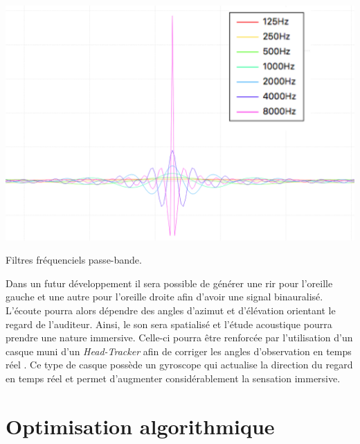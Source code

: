 \begin{figureth}
	\includegraphics[width=0.9\linewidth]{images/filtres}
	\caption{Filtres fréquenciels passe-bande.}
	\label{filtres}
\end{figureth}

Dans un futur développement il sera possible de générer une \gls{rir} pour l'oreille gauche et une autre pour l'oreille droite afin d'avoir une signal binauralisé. L'écoute pourra alors dépendre des angles d'azimut et d'élévation orientant le regard de l'auditeur. Ainsi, le son sera spatialisé et l'étude acoustique pourra prendre une nature immersive. Celle-ci pourra être renforcée par l'utilisation d'un casque muni d'un \textit{Head-Tracker} afin de corriger les angles d'observation en temps réel \cite{myBino}. Ce type de casque possède un gyroscope qui actualise la direction du regard en temps réel et permet d'augmenter considérablement la sensation immersive. 

%






\chapter{Optimisation algorithmique}
	\minitoc
	\newpage
	
\label{sect_complexite}

